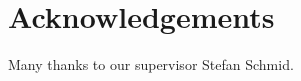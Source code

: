 \section{Acknowledgements}\label{sec:acknowledgements}
Many thanks to our supervisor Stefan Schmid.
